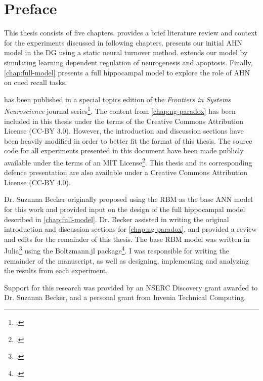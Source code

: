 \documentclass[
11pt, %
oneside, %
english, %
doublespacing
]{McMasterThesis} %
\begin{document}
\clearpage

\section*{Preface}
This thesis consists of five chapters.  provides a brief literature 
review and context for the experiments discussed in following chapters.
 presents our initial \ac{AHN} model in the \ac{DG} 
using a static neural turnover method. 
 extends our model by simulating learning dependent 
regulation of neurogenesis and apoptosis. 
Finally, \cref{chap:full-model} presents a full hippocampal model to explore the role 
of \ac{AHN} on cued recall tasks.
 
 has been published in a special topics edition of the 
{\em Frontiers in Systems Neuroscience} journal series\footcite{finnegan-becker-15}. 
The content from \cref{chap:ng-paradox} has been included in this thesis under the 
terms of the Creative Commons Attribution License (CC-BY 3.0). 
However, the introduction and discussion sections have been heavily 
modified in order to better fit the format of this thesis.
The source code for all experiments presented in this document have been made publicly available 
under the terms of an MIT License\footcite{thesis}.
This thesis and its corresponding defence presentation are also available under 
a Creative Commons Attribution License (CC-BY 4.0).
 
Dr. Suzanna Becker originally proposed using the \ac{RBM} as the base \ac{ANN} model for this work 
and provided input on the design of the full hippocampal 
model described in \cref{chap:full-model}.
Dr. Becker assisted in writing the original introduction and discussion 
sections for \cref{chap:ng-paradox}, and provided a review and 
edits for the remainder of this thesis. 
The base \ac{RBM} model was written in Julia\footcite{julialang} using the Boltzmann.jl 
package\footcite{boltzmannjl}. 
I was responsible for writing the remainder of the manuscript, 
as well as designing, implementing and analyzing the results from each experiment.

Support for this research was provided by an NSERC Discovery grant awarded to Dr. Suzanna Becker,
and a personal grant from Invenia Technical Computing.

\clearpage
\end{document}

